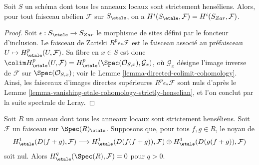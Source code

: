 \begin{lemma}
\label{lemma-local-rings-strictly-henselian}
Soit $S$ un schéma dont tous les anneaux locaux sont strictement henséliens.
Alors, pour tout faisceau abélien $\mathcal{F}$ sur $S_\etale$, on a
$H^i(S_\etale, \mathcal{F}) = H^i(S_{Zar}, \mathcal{F})$.
\end{lemma}

\begin{proof}
Soit $\epsilon : S_\etale \to S_{Zar}$ le morphisme de sites défini
par le foncteur d'inclusion. Le faisceau de Zariski $R^p\epsilon_*\mathcal{F}$
est le faisceau associé au préfaisceau $U \mapsto H^p_\etale(U, \mathcal{F})$.
Sa fibre en $x \in S$ est donc
$\colim H^p_\etale(U, \mathcal{F}) =
H^p_\etale(\Spec(\mathcal{O}_{S, x}), \mathcal{G}_x)$,
où $\mathcal{G}_x$ désigne l'image inverse de $\mathcal{F}$
sur $\Spec(\mathcal{O}_{S, x})$; voir le
Lemme \ref{lemma-directed-colimit-cohomology}.
Ainsi, les faisceaux d'images directes supérieures $R^p\epsilon_*\mathcal{F}$ sont
nuls d'après le
Lemme \ref{lemma-vanishing-etale-cohomology-strictly-henselian},
et l'on conclut par la suite spectrale de Leray.
\end{proof}

\begin{lemma}
\label{lemma-gabber-criterion}
Soit $R$ un anneau dont tous les anneaux locaux sont strictement henséliens.
Soit $\mathcal{F}$ un faisceau sur $\Spec(R)_\etale$.
Supposons que, pour tous $f,g\in R$, le noyau de
$$
H^1_\etale(D(f + g), \mathcal{F})
\longrightarrow
H^1_\etale(D(f(f + g)), \mathcal{F}) \oplus
H^1_\etale(D(g(f + g)), \mathcal{F})
$$
soit nul. Alors $H^q_\etale(\Spec(R), \mathcal{F}) = 0$ pour $q > 0$.
\end{lemma}

